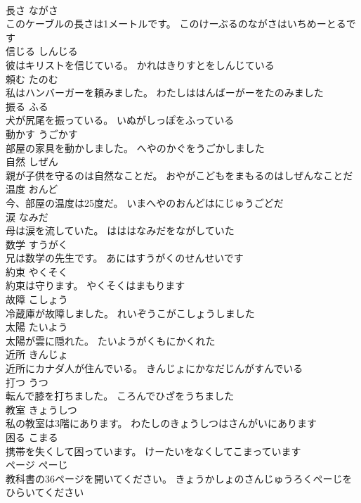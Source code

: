 \documentclass[8pt]{extreport}
\begin{document}
\begin{CJK}{UTF8}{min}
\\	長さ	ながさ	
\\	このケーブルの長さは1メートルです。	このけーぶるのながさはいちめーとるです	
\\	信じる	しんじる	
\\	彼はキリストを信じている。	かれはきりすとをしんじている	
\\	頼む	たのむ	
\\	私はハンバーガーを頼みました。	わたしははんばーがーをたのみました	
\\	振る	ふる	
\\	犬が尻尾を振っている。	いぬがしっぽをふっている	
\\	動かす	うごかす	
\\	部屋の家具を動かしました。	へやのかぐをうごかしました	
\\	自然	しぜん	
\\	親が子供を守るのは自然なことだ。	おやがこどもをまもるのはしぜんなことだ	
\\	温度	おんど	
\\	今、部屋の温度は25度だ。	いまへやのおんどはにじゅうごどだ	
\\	涙	なみだ	
\\	母は涙を流していた。	はははなみだをながしていた	
\\	数学	すうがく	
\\	兄は数学の先生です。	あにはすうがくのせんせいです	
\\	約束	やくそく	
\\	約束は守ります。	やくそくはまもります	
\\	故障	こしょう	
\\	冷蔵庫が故障しました。	れいぞうこがこしょうしました	
\\	太陽	たいよう	
\\	太陽が雲に隠れた。	たいようがくもにかくれた	
\\	近所	きんじょ	
\\	近所にカナダ人が住んでいる。	きんじょにかなだじんがすんでいる	
\\	打つ	うつ	
\\	転んで膝を打ちました。	ころんでひざをうちました	
\\	教室	きょうしつ	
\\	私の教室は3階にあります。	わたしのきょうしつはさんがいにあります	
\\	困る	こまる	
\\	携帯を失くして困っています。	けーたいをなくしてこまっています	
\\	ページ	ぺーじ	
\\	教科書の36ページを開いてください。	きょうかしょのさんじゅうろくぺーじをひらいてください	

\end{CJK}
\end{document}
